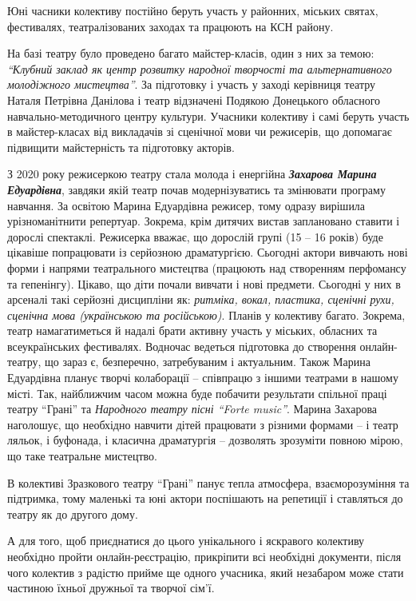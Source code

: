 Юні часники колективу постійно беруть участь у районних, міських святах,
фестивалях, театралізованих заходах та працюють на КСН району.


На базі театру було проведено багато майстер-класів, один з них за темою:
\emph{\enquote{Клубний заклад як центр розвитку народної творчості та альтернативного
молодіжного мистецтва}}. За підготовку і участь у заході керівниця театру Наталя
Петрівна Данілова і театр відзначені Подякою Донецького обласного
навчально-методичного центру культури. Учасники колективу і самі беруть участь в
майстер-класах від викладачів зі сценічної мови чи режисерів, що допомагає
підвищити майстерність та підготовку акторів.  

З 2020 року режисеркою театру стала молода і енергійна \emph{\textbf{Захарова Марина
Едуардівна}}, завдяки якій театр почав модернізуватись та змінювати програму
навчання. За освітою Марина Едуардівна режисер, тому одразу вирішила
урізноманітнити репертуар. Зокрема, крім дитячих вистав  заплановано ставити і
дорослі спектаклі. Режисерка вважає, що дорослій групі (15 – 16 років) буде
цікавіше попрацювати із серйозною драматургією. Сьогодні актори вивчають нові
форми і напрями театрального мистецтва (працюють над створенням перфомансу та
гепенінгу). Цікаво, що діти почали вивчати і нові предмети. Сьогодні у них в
арсеналі такі серйозні дисципліни як: \emph{ритміка, вокал, пластика, сценічні рухи,
сценічна мова (українською та російською)}. Планів у колективу багато. Зокрема,
театр намагатиметься й надалі брати активну участь у міських, обласних та
всеукраїнських фестивалях. Водночас ведеться підготовка до створення
онлайн-театру, що зараз є, безперечно, затребуваним і актуальним. Також Марина
Едуардівна планує творчі колаборації – співпрацю з іншими театрами в нашому
місті. Так, найближчим часом можна буде побачити результати спільної праці
театру \enquote{Грані} та \emph{Народного театру пісні \enquote{Forte music}}. Марина Захарова
наголошує, що необхідно навчити дітей працювати з різними формами – і театр
ляльок, і буфонада, і класична драматургія – дозволять зрозуміти повною мірою,
що таке театральне мистецтво.


В колективі Зразкового театру \enquote{Грані} панує тепла атмосфера, взаєморозуміння та
підтримка, тому маленькі та юні актори поспішають на репетиції і ставляться до
театру як до другого дому.


А для того, щоб приєднатися до цього унікального і яскравого колективу
необхідно пройти онлайн-реєстрацію, прикріпити всі необхідні документи, після
чого колектив з радістю прийме ще одного учасника, який незабаром може стати
частиною їхньої дружньої та творчої сім'ї.

